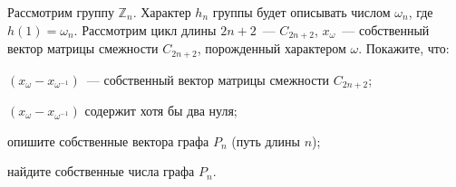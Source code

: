 Рассмотрим группу $\mathbb{Z}_n$. Характер $h_n$ группы будет  описывать числом $\omega_n$, где $h(1) = \omega_n$. Рассмотрим
цикл длины $2n + 2$~--- $C_{2n +  2}$, $x_{\omega}$~--- собственный вектор матрицы смежности $C_{2n + 2}$, порожденный
характером $\omega$. Покажите, что:

\begin{enumcyr}
    \item $(x_{\omega} - x_{\omega^{-1}})$~--- собственный вектор матрицы смежности $C_{2n + 2}$;
    \item $(x_{\omega} - x_{\omega^{-1}})$ содержит хотя бы два нуля;
    \item опишите собственные вектора графа $P_n$ (путь длины $n$);
    \item найдите собственные числа графа $P_n$.
\end{enumcyr}

